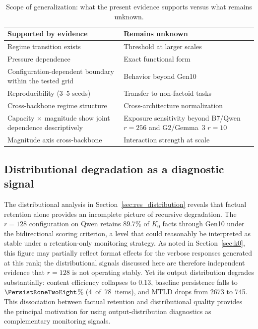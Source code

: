 \documentclass[a4paper,fleqn]{cas-dc}
\newif\ifshowchanges
\newcommand{\rev}[1]{\ifshowchanges{\color{blue}#1}\else{#1}\fi}
\renewcommand{\arraystretch}{1.8}
\begin{document}
\begin{table}[!htbp]
\caption{Scope of generalization: what the present evidence supports versus
what remains unknown.}\label{tab:generalization}
\footnotesize
\renewcommand{\arraystretch}{1.4}
\begin{tabular}{@{}p{3.6cm}p{3.6cm}@{}}
\toprule
\textbf{Supported by evidence} & \textbf{Remains unknown} \\
\midrule
Regime transition exists & Threshold at larger scales \\
\addlinespace
Pressure dependence & Exact functional form \\
\addlinespace
\rev{Configuration-dependent boundary within the tested grid} & Behavior beyond Gen10 \\
\addlinespace
Reproducibility (3--5 seeds) & Transfer to non-factoid tasks \\
\addlinespace
Cross-backbone regime structure & Cross-architecture normalization \\
\addlinespace
Capacity $\times$ magnitude \rev{show joint dependence descriptively} & \rev{Exposure sensitivity beyond B7/Qwen $r=256$ and G2/Gemma~3 $r=10$} \\
\addlinespace
Magnitude axis cross-backbone & Interaction strength at scale \\
\bottomrule
\end{tabular}
\end{table}

\subsection{Distributional degradation as a diagnostic signal}\label{sec:disc_drift}

The distributional analysis in Section~\ref{sec:res_distribution} reveals that
factual retention alone provides an incomplete picture of recursive degradation.
The $r=128$ configuration on Qwen retains 89.7\% of $K_0$ facts through Gen10
under the bidirectional scoring criterion,
a level that could reasonably be interpreted as stable under a retention-only
monitoring strategy. As noted in Section~\ref{sec:k0}, this figure may
partially reflect format effects for the verbose responses generated at this
rank; the distributional signals discussed here are therefore independent
evidence that $r=128$ is not operating stably. Yet its output distribution degrades substantially: content
efficiency collapses to 0.13, baseline persistence falls to \rev{$\PersistRoneTwoEight$\% (4~of~78~items)}, and MTLD
drops from 2673 to 745. This dissociation between factual retention and
distributional quality provides the principal motivation for using
output-distribution diagnostics as complementary monitoring signals.
\end{document}
